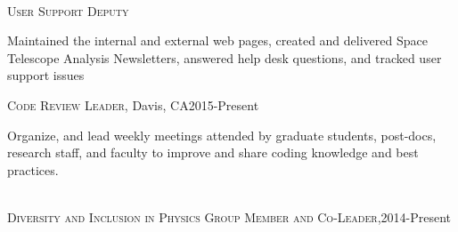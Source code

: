 \documentclass[10pt]{cv}
\begin{document}
\begin{llist}
\\
\textsc{User Support Deputy}\\
\begin{minipage}[l]{0.7\textwidth}\vspace{0.15cm}
Maintained the internal and external web pages, created and delivered Space Telescope Analysis Newsletters, answered help desk questions, and tracked user support issues\\
\end{minipage}\vspace{0.15cm}
\textsc{Code Review Leader}, Davis, CA\hfill 2015-Present\\
\begin{minipage}[l]{0.7\textwidth}\vspace{0.15cm}
Organize, and lead weekly meetings attended by graduate students, post-docs, research staff, and faculty to improve and share coding knowledge and best practices.\\
\end{minipage}\vspace{0.15cm}
\\
\textsc{Diversity and Inclusion in Physics Group Member and Co-Leader,}\hfill 2014-Present\\

\end{llist}
\end{document}
